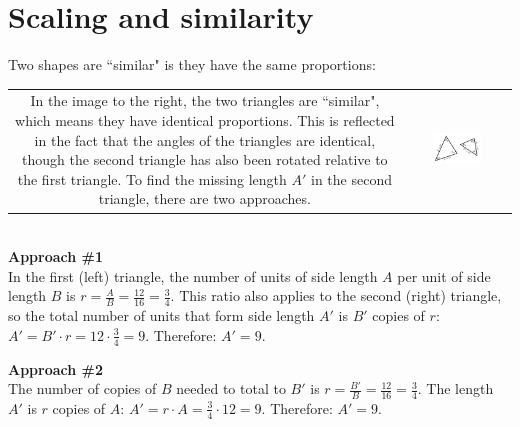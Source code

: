 \documentclass{article}
\begin{document}
\section{Scaling and similarity}

Two shapes are ``similar" is they have the same proportions:

\begin{tabular}{cc}
\parbox{0.4\textwidth}{
In the image to the right, the two triangles are ``similar", which means they have identical proportions. This is reflected in the fact that the angles of the triangles are identical, though the second triangle has also been rotated relative to the first triangle. 
To find the missing length \(A'\) in the second triangle, there are two approaches. 
} & 
\parbox{0.5\textwidth}{\includegraphics[width = 0.5\textwidth]{similar_triangles_1}}
\end{tabular} \\

\textbf{Approach \#1} \\
In the first (left) triangle, the number of units of side length \(A\) per unit of side length \(B\) is \(r = \frac{A}{B} = \frac{12}{16} = \frac{3}{4}\). This ratio also applies to the second (right) triangle, so the total number of units that form side length \(A'\) is \(B'\) copies of \(r\): \(A' = B' \cdot r = 12 \cdot \frac{3}{4} = 9\). Therefore: \(A' = 9\). 

\textbf{Approach \#2} \\
The number of copies of \(B\) needed to total to \(B'\) is \(r = \frac{B'}{B} = \frac{12}{16} = \frac{3}{4}\). The length \(A'\) is \(r\) copies of \(A\): \(A' = r \cdot A = \frac{3}{4} \cdot 12 = 9\). Therefore: \(A' = 9\).
\end{document}
